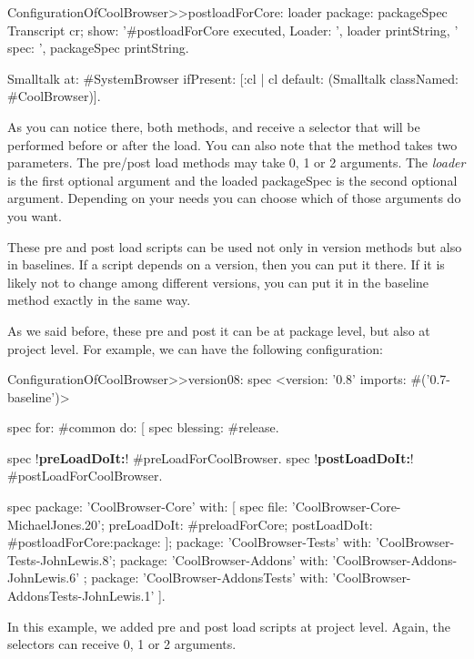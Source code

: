 \documentclass[a4paper,10pt,twoside]{book}
\begin{document}
\begin{code}{}
ConfigurationOfCoolBrowser>>postloadForCore: loader package: packageSpec
	Transcript cr; 
		show: '#postloadForCore executed, Loader: ', loader printString, 
			' spec: ', packageSpec printString.
	
	Smalltalk at: #SystemBrowser ifPresent: [:cl | cl default: (Smalltalk classNamed: #CoolBrowser)].
\end{code}

As you can notice there, both methods,  and  receive a selector that will be performed before or after the load. You can also note that the method   takes two parameters. The pre/post load methods may take 0, 1 or 2 arguments. The {\em loader}  is the first optional argument and the loaded packageSpec is the second optional argument. Depending on your needs you can choose which of those arguments do you want.

These pre and post load scripts can be used not only in version methods but also in baselines. If a script depends on a version, then you can put it there. If it is likely not to change among different versions, you can put it in the baseline method exactly in the same way.

As we said before, these pre and post it can be at package level, but also at project level. For example, we can have the following configuration:

\begin{code}{} 
ConfigurationOfCoolBrowser>>version08: spec 
	<version: '0.8' imports: #('0.7-baseline')>
	
	spec for: #common do: [
		spec blessing: #release.
		
		spec !\textbf{preLoadDoIt:}! #preLoadForCoolBrowser.
		spec !\textbf{postLoadDoIt:}! #postLoadForCoolBrowser.
	
		spec 
			package: 'CoolBrowser-Core' with: [
				spec 
					file: 'CoolBrowser-Core-MichaelJones.20';
					preLoadDoIt: #preloadForCore;
					postLoadDoIt: #postloadForCore:package: ];
			package: 'CoolBrowser-Tests' with: 'CoolBrowser-Tests-JohnLewis.8';
			package: 'CoolBrowser-Addons' with: 'CoolBrowser-Addons-JohnLewis.6' ;
			package: 'CoolBrowser-AddonsTests' with: 'CoolBrowser-AddonsTests-JohnLewis.1' ].
\end{code}

In this example, we added pre and post load scripts at project level. Again, the selectors can receive 0, 1 or 2 arguments. 
\end{document}
